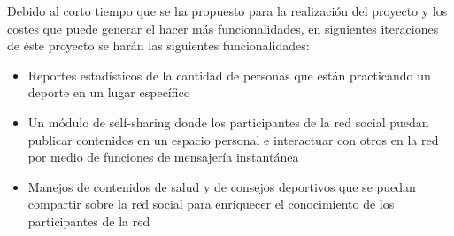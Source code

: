 Debido al corto tiempo que se ha propuesto para la realización del proyecto y los costes que puede generar el hacer más funcionalidades, en siguientes iteraciones de éste proyecto se harán las siguientes funcionalidades:

\begin{itemize}
	\item Reportes estadísticos de la cantidad de personas que están practicando un deporte en un lugar específico
	\item Un módulo de self-sharing donde los participantes de la red social puedan publicar contenidos en un espacio personal e interactuar con otros en la red por medio de funciones de mensajería instantánea
	\item Manejos de contenidos de salud y de consejos deportivos que se puedan compartir sobre la red social para enriquecer el conocimiento de los participantes de la red
\end{itemize}